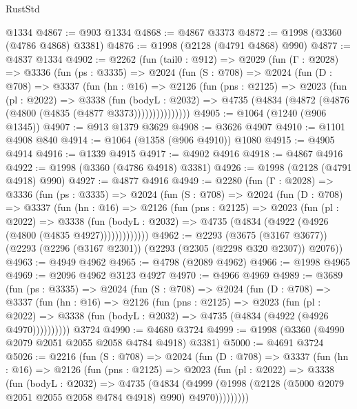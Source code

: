 \begin{lexlean}{RustStd}
\begin{coremodule}
    @1334
@4867 := @903 @1334
@4868 := @4867 @3373
@4872 := @1998 (@3360 (@4786 @4868) @3381)
@4876 := @1998 (@2128 (@4791 @4868) @990)
@4877 := @4837 @1334
@4902 := @2262
    (fun (tail0 : @912) =>
    @2029
      (fun (Γ : @2028) =>
      @3336
        (fun (ps : @3335) =>
        @2024
          (fun (S : @708) =>
          @2024
            (fun (D : @708) =>
            @3337
              (fun (hn : @16) =>
              @2126
                (fun (pns : @2125) =>
                @2023
                  (fun (pl : @2022) =>
                  @3338
                    (fun (bodyL : @2032) =>
                    @4735 (@4834 (@4872 (@4876 (@4800 (@4835 (@4877 @3373)))))))))))))))
@4905 := @1064 (@1240 (@906 @1345))
@4907 := @913 @1379 @3629
@4908 := @3626 @4907
@4910 := @1101 @4908 @840
@4914 := @1064 (@1358 (@906 @4910)) @1080
@4915 := @4905 @4914
@4916 := @1339 @4915
@4917 := @4902 @4916
@4918 := @4867 @4916
@4922 := @1998 (@3360 (@4786 @4918) @3381)
@4926 := @1998 (@2128 (@4791 @4918) @990)
@4927 := @4877 @4916
@4949 := @2280
    (fun (Γ : @2028) =>
    @3336
      (fun (ps : @3335) =>
      @2024
        (fun (S : @708) =>
        @2024
          (fun (D : @708) =>
          @3337
            (fun (hn : @16) =>
            @2126
              (fun (pns : @2125) =>
              @2023
                (fun (pl : @2022) =>
                @3338
                  (fun (bodyL : @2032) =>
                  @4735 (@4834 (@4922 (@4926 (@4800 (@4835 @4927)))))))))))))
@4962 := @2293
    (@3675 (@3167 @3677))
    (@2293 (@2296 (@3167 @2301)) (@2293 (@2305 (@2298 @320 @2307)) @2076))
@4963 := @4949 @4962
@4965 := @4798 (@2089 @4962)
@4966 := @1998 @4965
@4969 := @2096 @4962 @3123 @4927
@4970 := @4966 @4969
@4989 := @3689
    (fun (ps : @3335) =>
    @2024
      (fun (S : @708) =>
      @2024
        (fun (D : @708) =>
        @3337
          (fun (hn : @16) =>
          @2126
            (fun (pns : @2125) =>
            @2023
              (fun (pl : @2022) =>
              @3338 (fun (bodyL : @2032) => @4735 (@4834 (@4922 (@4926 @4970))))))))))
    @3724
@4990 := @4680 @3724
@4999 := @1998 (@3360 (@4990 @2079 @2051 @2055 @2058 @4784 @4918) @3381)
@5000 := @4691 @3724
@5026 := @2216
    (fun (S : @708) =>
    @2024
      (fun (D : @708) =>
      @3337
        (fun (hn : @16) =>
        @2126
          (fun (pns : @2125) =>
          @2023
            (fun (pl : @2022) =>
            @3338
              (fun (bodyL : @2032) =>
              @4735
                (@4834
                  (@4999
                    (@1998 (@2128 (@5000 @2079 @2051 @2055 @2058 @4784 @4918) @990) @4970)))))))))

\end{coremodule}
\end{lexlean}
